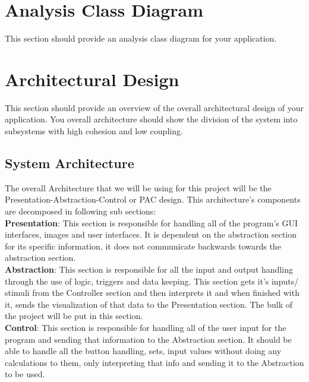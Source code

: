 \documentclass[]{article}
\begin{document}

\section{Analysis Class Diagram}
\label{sec:analysis_class_diagram}
This section should provide an analysis class diagram for your application.

\section{Architectural Design}
\label{sec:architectural_design}
This section should provide an overview of the overall architectural design of
your application. You overall architecture should show the division of the system
into subsystems with high cohesion and low coupling.

\subsection{System Architecture}
\label{sub:system_architecture}

The overall Architecture that we will be using for this project will be the 
Presentation-Abstraction-Control or PAC design. This architecture’s components 
are decomposed in following sub sections: \\

\textbf{Presentation}: This section is responsible for handling all of the program’s
GUI interfaces, images and user interfaces. It is dependent on the abstraction section
for its specific information, it does not communicate backwards towards the abstraction section. \\

\textbf{Abstraction}: This section is responsible for all the input and output
handling through the use of logic, triggers and data keeping. This section gets it’s
inputs/ stimuli from the Controller section and then interprets it and when finished
with it, sends the visualization of that data to the Presentation section. The bulk
of the project will be put in this section. \\

\textbf{Control}: This section is responsible for handling all of the user input
for the program and sending that information to the Abstraction section. It should
be able to handle all the button handling, sets, input values without doing any
calculations to them, only interpreting that info and sending it to the Abstraction to be used. \\
\end{document}
